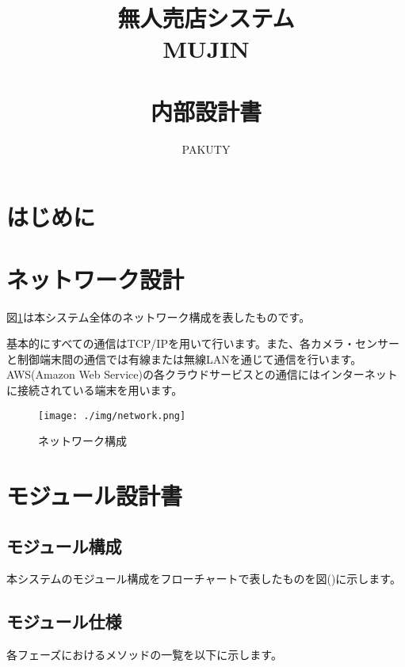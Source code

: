 \documentclass[a4, dvipdfmx, uplatex]{jsarticle}
\title{
\vspace{30mm}
{\bf 無人売店システム} \\ \vspace{5mm}
{\bf MUJIN } \\ \vspace{5mm}　\\
{\bf 内部設計書 }
\vspace{90mm}
}
\author {
\vspace{5mm}
PAKUTY
}
\begin{document}
\maketitle
\newpage
\tableofcontents
\newpage

\section{はじめに}

\section{ネットワーク設計}
図\ref{img: network}は本システム全体のネットワーク構成を表したものです。

基本的にすべての通信はTCP/IPを用いて行います。また、各カメラ・センサーと制御端末間の通信では有線または無線LANを通じて通信を行います。AWS(Amazon Web Service)の各クラウドサービスとの通信にはインターネットに接続されている端末を用います。

\begin{figure}[H]
  \centering
  \texttt{[image: ./img/network.png]}
  \caption{ネットワーク構成}
  \label{img: network}
\end{figure}

\section{モジュール設計書}
\subsection{モジュール構成}
本システムのモジュール構成をフローチャートで表したものを図()に示します。

\subsection{モジュール仕様}
各フェーズにおけるメソッドの一覧を以下に示します。
\end{document}

